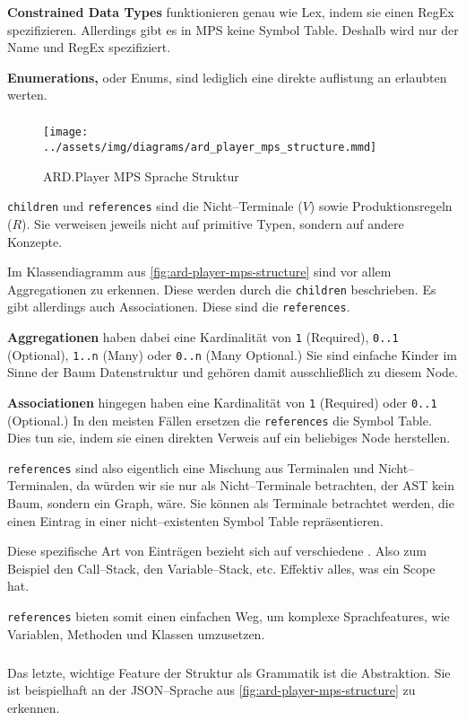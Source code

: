 \textbf{Constrained Data Types} funktionieren genau wie Lex, indem sie einen \ac{RegEx} spezifizieren.
Allerdings gibt es in \ac{MPS} keine Symbol Table.
Deshalb wird nur der Name und \ac{RegEx} spezifiziert.

\textbf{Enumerations,} oder Enums, sind lediglich eine direkte auflistung an erlaubten werten.

\subparagraph*{}
\begin{figure}
    \texttt{[image: ../assets/img/diagrams/ard\_player\_mps\_structure.mmd]}
    \caption{ARD.Player MPS Sprache Struktur}
    \label{fig:ard-player-mps-structure}
\end{figure}
\verb|children| und \verb|references| sind die Nicht--Terminale ($V$) sowie Produktionsregeln ($R$).
Sie verweisen jeweils nicht auf primitive Typen, sondern auf andere Konzepte.

Im Klassendiagramm aus \autoref{fig:ard-player-mps-structure} sind vor allem Aggregationen zu erkennen.
Diese werden durch die \verb|children| beschrieben.
Es gibt allerdings auch Associationen.
Diese sind die \verb|references|.

\textbf{Aggregationen} haben dabei eine Kardinalität von \verb|1| (Required), \verb|0..1| (Optional), \verb|1..n| (Many) oder \verb|0..n| (Many Optional.)
Sie sind einfache Kinder im Sinne der Baum Datenstruktur und gehören damit ausschließlich zu diesem Node.

\textbf{Associationen} hingegen haben eine Kardinalität von \verb|1| (Required) oder \verb|0..1| (Optional.)
In den meisten Fällen ersetzen die \verb|references| die Symbol Table.
Dies tun sie, indem sie einen direkten Verweis auf ein beliebiges Node herstellen.

\verb|references| sind also eigentlich eine Mischung aus Terminalen und Nicht--Terminalen, da würden wir sie nur als Nicht--Terminale betrachten, der \ac{AST} kein Baum, sondern ein Graph, wäre.
Sie können als Terminale betrachtet werden, die einen Eintrag in einer nicht--existenten Symbol Table repräsentieren.

Diese spezifische Art von Einträgen bezieht sich auf verschiedene .
Also zum Beispiel den Call--Stack, den Variable--Stack, etc.
Effektiv alles, was ein Scope hat.

\verb|references| bieten somit einen einfachen Weg, um komplexe Sprachfeatures, wie Variablen, Methoden und Klassen umzusetzen.

\subparagraph*{}
Das letzte, wichtige Feature der Struktur als Grammatik ist die Abstraktion.
Sie ist beispielhaft an der \ac{JSON}--Sprache aus \autoref{fig:ard-player-mps-structure} zu erkennen.

